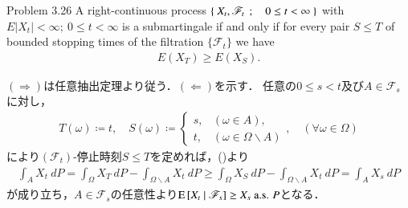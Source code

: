 	\begin{itembox}[l]{Problem 3.26}
		A right-continuous process $\left\{\ X_t,\mathscr{F}_t\ \, ; \quad 0 \leq t < \infty\ \right\}$ with $E|X_t| < \infty;\ 0 \leq t < \infty$
		is a submartingale if and only if for every pair $S \leq T$ of bounded stopping times of 
		the filtration $\{\mathscr{F}_t\}$ we have
		\begin{align}
			E(X_T) \geq E(X_S).
			\label{chapter_1_Problem_3_26_1}
		\end{align}
	\end{itembox}
	
	\begin{prf}
		$(\Rightarrow)$は任意抽出定理より従う．$(\Leftarrow)$を示す．
		任意の$0 \leq s < t$及び$A \in \mathscr{F}_s$に対し，
		\begin{align}
			T(\omega) \coloneqq t,
			\quad 
			S(\omega) \coloneqq
			\begin{cases}
				s, & (\omega \in A), \\
				t, & (\omega \in \Omega \backslash A)
			\end{cases},
			\quad (\forall \omega \in \Omega)
		\end{align}
		により$(\mathscr{F}_t)$-停止時刻$S \leq T$を定めれば，()より
		\begin{align}
			\int_A X_t\ dP = \int_\Omega X_T\ dP - \int_{\Omega \backslash A} X_t\ dP
			\geq \int_\Omega X_S\ dP - \int_{\Omega \backslash A} X_t\ dP
			= \int_A X_s\ dP
		\end{align}
		が成り立ち，$A \in \mathscr{F}_s$の任意性より$\operatorname{E} \left[ X_t \ \middle|\ \mathscr{F}_s \right] \geq X_s\ \mbox{a.s. $P$}$となる．
		\QED
	\end{prf}
	
